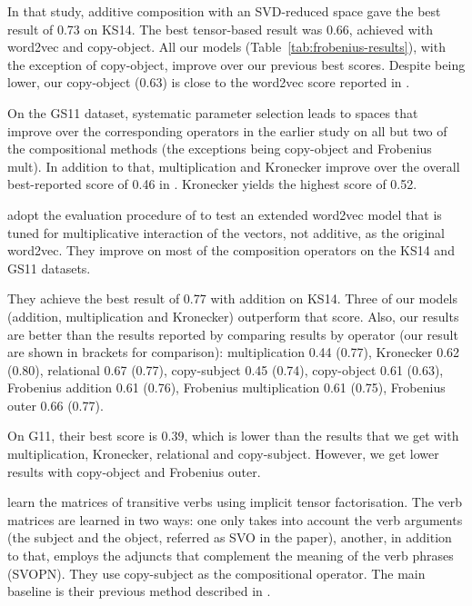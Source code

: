 In that study, additive composition with an SVD-reduced space gave the best result of 0.73 on KS14. The best tensor-based result was 0.66, achieved with word2vec and copy-object. All our models (Table~\ref{tab:frobenius-results}), with the exception of copy-object, improve over our previous best scores. Despite being lower, our copy-object (0.63) is close to the word2vec score reported in .

On the GS11 dataset, systematic parameter selection leads to spaces that improve over the corresponding operators in the earlier study on all but two of the compositional methods (the exceptions being copy-object and Frobenius mult). In addition to that, multiplication and Kronecker improve over the overall best-reported score of 0.46 in . Kronecker yields the highest score of 0.52.

 adopt the evaluation procedure of  to test an extended word2vec model that is tuned for multiplicative interaction of the vectors, not additive, as the original word2vec. They improve on most of the composition operators on the KS14 and GS11 datasets.

They achieve the best result of 0.77 with addition on KS14. Three of our models (addition, multiplication and Kronecker) outperform that score. Also, our results are better than the results reported  by comparing results by operator (our result are shown in brackets for comparison): multiplication 0.44 (0.77), Kronecker 0.62 (0.80), relational 0.67 (0.77), copy-subject 0.45 (0.74), copy-object 0.61 (0.63), Frobenius addition 0.61 (0.76), Frobenius multiplication 0.61 (0.75), Frobenius outer 0.66 (0.77).

On G11, their best score is 0.39, which is lower than the results that we get with multiplication, Kronecker, relational and copy-subject. However, we get lower results with copy-object and Frobenius outer.

 learn the matrices of transitive verbs using implicit tensor factorisation. The verb matrices are learned in two ways: one only takes into account the verb arguments (the subject and the object, referred as SVO in the paper), another, in addition to that, employs the adjuncts that complement the meaning of the verb phrases (SVOPN). They use copy-subject as the compositional operator. The main baseline is their previous method described in .

